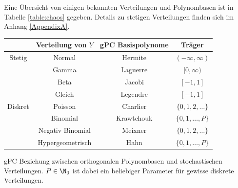 Eine Übersicht von einigen bekannten Verteilungen und Polynombasen ist in Tabelle \ref{table:chaos} gegeben. Details zu stetigen Verteilungen finden sich im Anhang \ref{AppendixA}.\\
\begin{center}
\begin{tabular}{c|ccc}
 & Verteilung von $Y$ & gPC Basispolynome & Träger \\ 
\hline 
Stetig & Normal & Hermite & $(-\infty,\infty)$ \\ 
 & Gamma & Laguerre & $[0,\infty)$ \\ 
 & Beta & Jacobi & $[-1,1]$ \\
 & Gleich & Legendre & $[-1,1]$ \\  
\hline 
Diskret & Poisson & Charlier & $\lbrace 0,1,2,\dots\rbrace$ \\ 
 & Binomial & Krawtchouk & $\lbrace 0,1,\dots,P\rbrace$ \\ 
 & Negativ Binomial & Meixner & $\lbrace 0,1,2,\dots\rbrace$ \\  
 & Hypergeometrisch & Hahn & $\lbrace 0,1,\dots,P\rbrace$
\label{table:chaos}
\end{tabular} 
gPC Beziehung zwischen orthogonalen Polynombasen und stochastischen Verteilungen. $P\in\N_0$ ist dabei ein beliebiger Parameter für gewisse diskrete Verteilungen.
\end{center}

